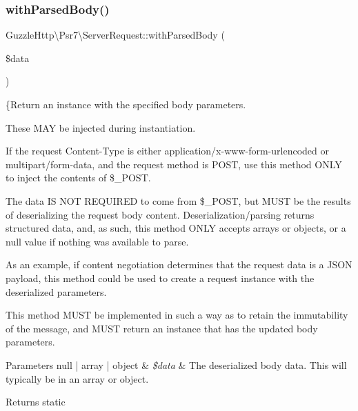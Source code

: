 \mbox{\label{classGuzzleHttp_1_1Psr7_1_1ServerRequest_a7213bb1e535098e50d40f614f085d3fc}} 
\subsubsection{\texorpdfstring{with\+Parsed\+Body()}{withParsedBody()}}
{\footnotesize\ttfamily Guzzle\+Http\textbackslash{}\+Psr7\textbackslash{}\+Server\+Request\+::with\+Parsed\+Body (\begin{DoxyParamCaption}\item[{}]{\$data }\end{DoxyParamCaption})}

\{Return an instance with the specified body parameters.

These M\+AY be injected during instantiation.

If the request Content-\/\+Type is either application/x-\/www-\/form-\/urlencoded or multipart/form-\/data, and the request method is P\+O\+ST, use this method O\+N\+LY to inject the contents of \$\+\_\+\+P\+O\+ST.

The data IS N\+OT R\+E\+Q\+U\+I\+R\+ED to come from \$\+\_\+\+P\+O\+ST, but M\+U\+ST be the results of deserializing the request body content. Deserialization/parsing returns structured data, and, as such, this method O\+N\+LY accepts arrays or objects, or a null value if nothing was available to parse.

As an example, if content negotiation determines that the request data is a J\+S\+ON payload, this method could be used to create a request instance with the deserialized parameters.

This method M\+U\+ST be implemented in such a way as to retain the immutability of the message, and M\+U\+ST return an instance that has the updated body parameters.


\begin{DoxyParams}[1]{Parameters}
null | array | object & {\em \$data} & The deserialized body data. This will typically be in an array or object. \\
\hline
\end{DoxyParams}
\begin{DoxyReturn}{Returns}
static 
\end{DoxyReturn}

